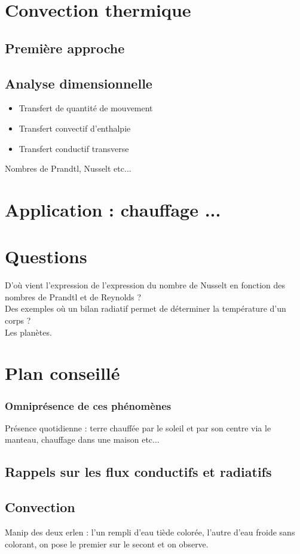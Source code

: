 \documentclass[12pt,prb,aps,epsf]{article}
\begin{document}
\section{Convection thermique}
\subsection{Première approche}
\subsection{Analyse dimensionnelle}
\begin{itemize}
	\item Transfert de quantité de mouvement
	\item Transfert convectif d'enthalpie
	\item Transfert conductif transverse
\end{itemize}

Nombres de Prandtl, Nusselt etc...

\section{Application : chauffage ...}


\section*{Questions}
D'où vient l'expression de l'expression du nombre de Nusselt en fonction des nombres de Prandtl et de Reynolds ?\\

Des exemples où un bilan radiatif permet de déterminer la température d'un corps ?\\
Les planètes.

\section{Plan conseillé}
\subsubsection{Omniprésence de ces phénomènes}
Présence quotidienne : terre chauffée par le soleil et par son centre via le manteau, chauffage dans une maison etc...
\subsection{Rappels sur les flux conductifs et radiatifs}
\subsection{Convection}
Manip des deux erlen : l'un rempli d'eau tiède colorée, l'autre d'eau froide sans colorant, on pose le premier sur le secont et on observe.
\end{document}
